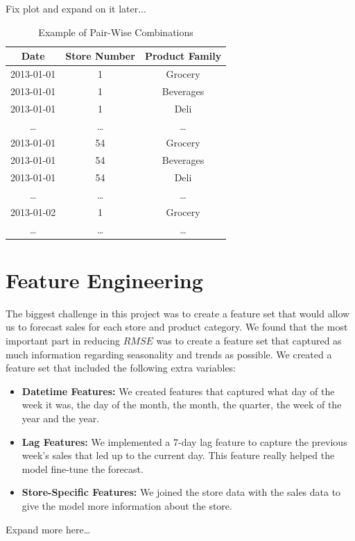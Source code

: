 \documentclass[12pt]{article}
\begin{document}
Fix plot and expand on it later...
\begin{table}[h]
\centering
\begin{tabular}{|c|c|c|}
\hline
\textbf{Date} & \textbf{Store Number} & \textbf{Product Family} \\ \hline
2013-01-01 & 1 & Grocery \\ \hline
2013-01-01 & 1 & Beverages \\ \hline
2013-01-01 & 1 & Deli \\ \hline
\dots & \dots & \dots \\ \hline
2013-01-01 & 54 & Grocery \\ \hline
2013-01-01 & 54 & Beverages \\ \hline
2013-01-01 & 54 & Deli \\ \hline
\dots & \dots & \dots \\ \hline
2013-01-02 & 1 & Grocery \\ \hline
\dots & \dots & \dots \\ \hline
\end{tabular}
\caption{Example of Pair-Wise Combinations}
\end{table}
\section{Feature Engineering}
The biggest challenge in this project was to create a feature set that would allow us to forecast sales for each store and product category.
We found that the most important part in reducing $RMSE$ was to create a feature set that captured as much information regarding seasonality and trends as possible.
We created a feature set that included the following extra variables:
\begin{itemize}
    \item \textbf{Datetime Features:} We created features that captured what day of the week it was, the day of the month, the month, the quarter, the week of the year and the year.
    \item \textbf{Lag Features:} We implemented a 7-day lag feature to capture the previous week's sales that led up to the current day. This feature really helped the model fine-tune the forecast.
    \item \textbf{Store-Specific Features:} We joined the store data with the sales data to give the model more information about the store. 
\end{itemize}
Expand more here\dots
\end{document}
